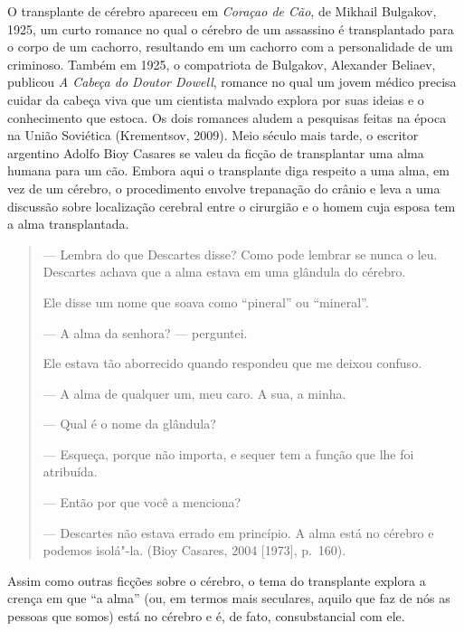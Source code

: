 O transplante de cérebro apareceu em \emph{Coraçao de Cão}, de Mikhail
Bulgakov, 1925, um curto romance no qual o cérebro de um assassino é
transplantado para o corpo de um cachorro, resultando em um cachorro com
a personalidade de um criminoso. Também em 1925, o compatriota de
Bulgakov, Alexander Beliaev, publicou \emph{A Cabeça do Doutor Dowell},
romance no qual um jovem médico precisa cuidar da cabeça viva que um
cientista malvado explora por suas ideias e o conhecimento que estoca.
Os dois romances aludem a pesquisas feitas na época na União Soviética
(Krementsov, 2009). Meio século mais tarde, o escritor argentino Adolfo
Bioy Casares se valeu da ficção de transplantar uma alma humana para um
cão. Embora aqui o transplante diga respeito a uma alma, em vez de um
cérebro, o procedimento envolve trepanação do crânio e leva a uma
discussão sobre localização cerebral entre o cirurgião e o homem cuja
esposa tem a alma transplantada.

\begin{quote}
--- Lembra do que Descartes disse? Como pode lembrar se nunca o leu.
Descartes achava que a alma estava em uma glândula do cérebro.

Ele disse um nome que soava como ``pineral'' ou ``mineral''.

--- A alma da senhora? --- perguntei.

Ele estava tão aborrecido quando respondeu que me deixou confuso.

--- A alma de qualquer um, meu caro. A sua, a minha.

--- Qual é o nome da glândula?

--- Esqueça, porque não importa, e sequer tem a função que lhe foi
atribuída.

--- Então por que você a menciona?

--- Descartes não estava errado em princípio. A alma está no cérebro e
podemos isolá"-la. (Bioy Casares, 2004 {[}1973{]}, p.~160).
\end{quote}

Assim como outras ficções sobre o cérebro, o tema do transplante explora
a crença em que ``a alma'' (ou, em termos mais seculares, aquilo que faz
de nós as pessoas que somos) está no cérebro e é, de fato,
consubstancial com ele.

